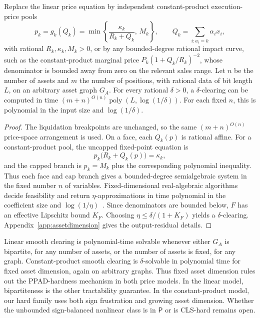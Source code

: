\documentclass{llncs}
\newcommand{\GA}{G_A}
\newcommand{\poly}{\operatorname{poly}}
\begin{document}
\begin{theorem}
\label{thm:arrangement-amm}
Replace the linear price equation by independent constant-product execution-price pools
\[
        p_k=g_k(Q_k)=\min\!\left\{\frac{\kappa_k}{R_k+Q_k},\,M_k\right\},
        \qquad
        Q_k=\sum_{i:a_i=k}\alpha_i x_i,
\]
with rational \(R_k,\kappa_k,M_k>0\), or by any bounded-degree rational impact curve, such as the constant-product marginal price \(P_k(1+Q_k/R_k)^{-2}\), whose denominator is bounded away from zero on the relevant sales range. Let \(n\) be the number of assets and \(m\) the number of positions, with rational data of bit length \(L\), on an arbitrary asset graph \(\GA\). For every rational \(\delta>0\), a \(\delta\)-clearing can be computed in time \((m+n)^{O(n)}\poly(L,\log(1/\delta))\). For each fixed \(n\), this is polynomial in the input size and \(\log(1/\delta)\).
\end{theorem}
\begin{proof}
The liquidation breakpoints are unchanged, so the same \((m+n)^{O(n)}\) price-space arrangement is used. On a face, each \(Q_k(p)\) is rational affine. For a constant-product pool, the uncapped fixed-point equation is
\[
        p_k\bigl(R_k+Q_k(p)\bigr)=\kappa_k,
\]
and the capped branch is \(p_k=M_k\) plus the corresponding polynomial inequality. Thus each face and cap branch gives a bounded-degree semialgebraic system in the fixed number \(n\) of variables. Fixed-dimensional real-algebraic algorithms decide feasibility and return \(\eta\)-approximations in time polynomial in the coefficient size and \(\log(1/\eta)\)~\cite{Renegar1992,BasuPollackRoy2006}. Since denominators are bounded below, \(F\) has an effective Lipschitz bound \(K_F\). Choosing \(\eta\le\delta/(1+K_F)\) yields a \(\delta\)-clearing. Appendix~\ref{app:assetdimension} gives the output-residual details.
\end{proof}

\begin{corollary}
\label{cor:tworesources}
Linear smooth clearing is polynomial-time solvable whenever either \(\GA\) is bipartite, for any number of assets, or the number of assets is fixed, for any graph. Constant-product smooth clearing is \(\delta\)-solvable in polynomial time for fixed asset dimension, again on arbitrary graphs. Thus fixed asset dimension rules out the PPAD-hardness mechanism in both price models. In the linear model, bipartiteness is the other tractability guarantee. In the constant-product model, our hard family uses both sign frustration and growing asset dimension. Whether the unbounded sign-balanced nonlinear class is in \(\mathsf P\) or is CLS-hard remains open.
\end{corollary}
\end{document}
